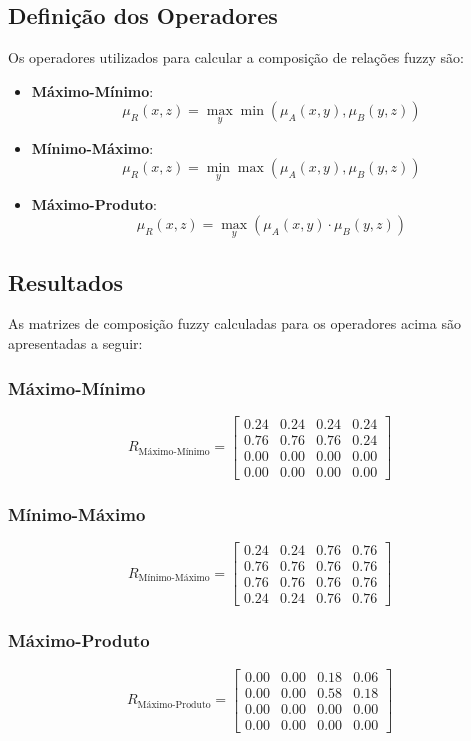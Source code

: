 \documentclass[a4paper,12pt]{article}
\begin{document}
\subsection{Definição dos Operadores}

Os operadores utilizados para calcular a composição de relações fuzzy são:

\begin{itemize}
    \item \textbf{Máximo-Mínimo}:
    \[
    \mu_R(x, z) = \max_y \min(\mu_A(x, y), \mu_B(y, z))
    \]

    \item \textbf{Mínimo-Máximo}:
    \[
    \mu_R(x, z) = \min_y \max(\mu_A(x, y), \mu_B(y, z))
    \]

    \item \textbf{Máximo-Produto}:
    \[
    \mu_R(x, z) = \max_y (\mu_A(x, y) \cdot \mu_B(y, z))
    \]
\end{itemize}

\subsection{Resultados}

As matrizes de composição fuzzy calculadas para os operadores acima são apresentadas a seguir:

\subsubsection{Máximo-Mínimo}
\[
R_{\text{Máximo-Mínimo}} =
\begin{bmatrix}
0.24 & 0.24 & 0.24 & 0.24 \\
0.76 & 0.76 & 0.76 & 0.24 \\
0.00 & 0.00 & 0.00 & 0.00 \\
0.00 & 0.00 & 0.00 & 0.00
\end{bmatrix}
\]

\subsubsection{Mínimo-Máximo}
\[
R_{\text{Mínimo-Máximo}} =
\begin{bmatrix}
0.24 & 0.24 & 0.76 & 0.76 \\
0.76 & 0.76 & 0.76 & 0.76 \\
0.76 & 0.76 & 0.76 & 0.76 \\
0.24 & 0.24 & 0.76 & 0.76
\end{bmatrix}
\]

\subsubsection{Máximo-Produto}
\[
R_{\text{Máximo-Produto}} =
\begin{bmatrix}
0.00 & 0.00 & 0.18 & 0.06 \\
0.00 & 0.00 & 0.58 & 0.18 \\
0.00 & 0.00 & 0.00 & 0.00 \\
0.00 & 0.00 & 0.00 & 0.00
\end{bmatrix}
\]
\end{document}
